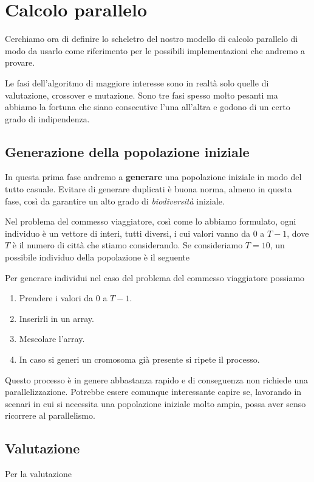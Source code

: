 \section{Calcolo parallelo}

Cerchiamo ora di definire lo scheletro del nostro modello di calcolo parallelo
di modo da usarlo come riferimento per le possibili implementazioni che andremo
a provare.

Le fasi dell'algoritmo di maggiore interesse sono in realtà solo quelle di
valutazione, crossover e mutazione. Sono tre fasi spesso molto pesanti ma
abbiamo la fortuna che siano consecutive l'una all'altra e godono di un certo
grado di indipendenza.

\subsection{Generazione della popolazione iniziale}

In questa prima fase andremo a \textbf{generare} una popolazione iniziale in
modo del tutto casuale. Evitare di generare duplicati è buona norma, almeno
in questa fase, così da garantire un alto grado di \emph{biodiversità} iniziale.

Nel problema del commesso viaggiatore, così come lo abbiamo formulato, ogni
individuo è un vettore di interi, tutti diversi, i cui valori vanno da $0$ a
$T-1$, dove $T$ è il numero di città che stiamo considerando. Se consideriamo
$T = 10$, un possibile individuo della popolazione è il seguente
\begin{center}
	
\end{center}
Per generare individui nel caso del problema del commesso viaggiatore possiamo
\begin{enumerate}
	\item Prendere i valori da $0$ a $T-1$.
	\item Inserirli in un array.
	\item Mescolare l'array.
	\item In caso si generi un cromosoma già presente si ripete il processo.
\end{enumerate}
Questo processo è in genere abbastanza rapido e di conseguenza non richiede
una parallelizzazione. Potrebbe essere comunque interessante capire se,
lavorando in scenari in cui si necessita una popolazione iniziale molto ampia,
possa aver senso ricorrere al parallelismo.

\subsection{Valutazione}

Per la valutazione


